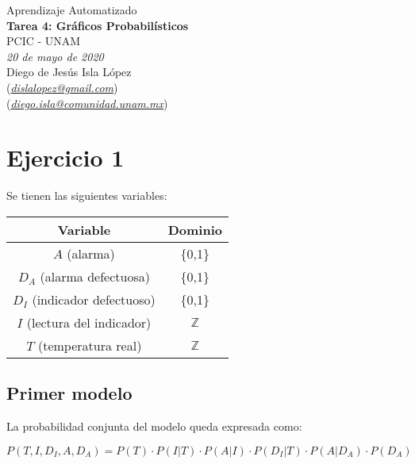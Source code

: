\documentclass[letterpaper,12pt]{article}
\theoremstyle{definition}
\begin{document}
\begin{center}
  {\large Aprendizaje Automatizado}\\
  \vspace{0.2cm}
  {\large\bfseries Tarea 4: Gráficos Probabilísticos}\\
  \vspace{0.2cm}
  {\large PCIC - UNAM}\\
  \vspace{0.5cm}
  {\itshape 20 de mayo de 2020}\\
  \vspace{0.5cm}
  Diego de Jesús Isla López\\
  (\href{mailto:dislalopez@gmail.com}{\itshape dislalopez@gmail.com})\\
  (\href{mailto:diego.isla@comunidad.unam.mx}{\itshape diego.isla@comunidad.unam.mx})\\
\end{center}


\section*{Ejercicio 1}

Se tienen las siguientes variables:

\begin{table}[H]
  \centering
  \begin{tabular}{|c|c|}
    \toprule
    Variable & Dominio \\
    \midrule
    \(A\) (alarma) & \{0,1\} \\
    \(D_A\) (alarma defectuosa) & \{0,1\} \\
    \(D_I\) (indicador defectuoso) & \{0,1\} \\
    \( I \) (lectura del indicador) & \(\mathbb{Z}\) \\
    \( T \) (temperatura real) & \(\mathbb{Z}\) \\
    \bottomrule
  \end{tabular}
\end{table}

\subsection*{Primer modelo}

La probabilidad conjunta del modelo queda expresada como:

\begin{equation}
  P(T,I,D_I,A,D_A) = P(T)\cdot P(I|T) \cdot P(A|I) \cdot P(D_I|T)\cdot P(A|D_A) \cdot P(D_A) 
\end{equation}
\end{document}
